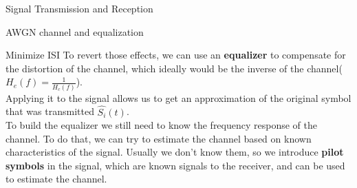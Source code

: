 \begin{section}{Signal Transmission and Reception}
\begin{subsection}{AWGN channel and equalization}
\begin{subsubsection}{Minimize ISI}
      To revert those effects, we can use an \textbf{equalizer} to compensate for the distortion
      of the channel, which ideally would be the inverse of the channel($H_e(f)=\frac{1}{H_c(f)}$).\\
      Applying it to the signal allows us to get an approximation of the original symbol that was
      transmitted $\hat{S_i}(t)$.\\

      To build the equalizer we still need to know the frequency response of the channel.
      To do that, we can try to estimate the channel based on known characteristics of the signal.
      Usually we don't know them, so we introduce \textbf{pilot symbols} in the signal, which are
      known signals to the receiver, and can be used to estimate the channel.
    \end{subsubsection}


\end{subsection}
\end{section}

